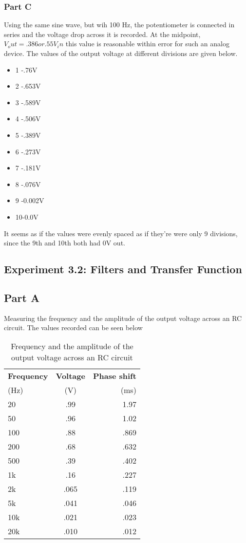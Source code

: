 \documentclass[10pt]{article}
\begin{document}
\subsubsection{Part C} 
	Using the same sine wave, but wih 100 Hz, the potentiometer is connected in series and the voltage drop across it is recorded. At the midpoint, $V_out = .386 or .55 V_in$ this value is reasonable within error for such an analog device. 
	The values of the output voltage at different divisions are given below.
	\begin{itemize}
		\item 1 -.76V
		\item 2 -.653V
		\item 3 -.589V
		\item 4 -.506V
		\item 5 -.389V
		\item 6 -.273V
		\item 7 -.181V
		\item 8 -.076V
		\item 9 -0.002V
		\item 10-0.0V
	\end{itemize}
 	It seems as if the values were evenly spaced as if they're were only 9 divisions, since the 9th and 10th both had 0V out.
\subsection{Experiment 3.2: Filters and Transfer Function}
\subsection{Part A}
	Measuring the frequency and the amplitude of the output voltage across an RC circuit. The values recorded can be seen below
\begin{table}[H]
\begin{center}
	\caption{Frequency and the amplitude of the output voltage across an RC circuit}
	\label{tab: 32A}
	   \begin{tabular}{l|c|r}
		\textbf{Frequency} & \textbf{Voltage} & \textbf{Phase shift}\\
		(Hz) & (V) & (ms) \\
		\hline
		20 & .99 & 1.97\\
		50 & .96 & 1.02\\
		100 & .88 & .869\\
		200 & .68 & .632\\
		500 & .39 & .402\\
		1k & .16 & .227\\
		2k & .065 & .119\\
		5k & .041 & .046\\
		10k & .021 & .023\\
		20k & .010 & .012\\
	\end{tabular}
\end{center}
\end{table}
\end{document}
